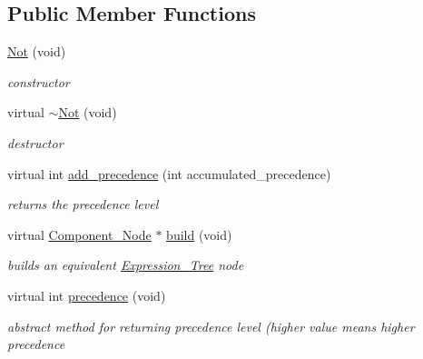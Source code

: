 \subsection*{Public Member Functions}
\begin{DoxyCompactItemize}
\item 
\hyperlink{classMadara_1_1Expression__Tree_1_1Not_afe8e0c695f7eea7d454fb06106767bc5}{Not} (void)
\begin{DoxyCompactList}\small\item\em constructor \item\end{DoxyCompactList}\item 
virtual \hyperlink{classMadara_1_1Expression__Tree_1_1Not_a1652e6eee2648ab3768060773da8d72c}{$\sim$Not} (void)
\begin{DoxyCompactList}\small\item\em destructor \item\end{DoxyCompactList}\item 
virtual int \hyperlink{classMadara_1_1Expression__Tree_1_1Not_ac176735ebcb97996318e20ee02147094}{add\_\-precedence} (int accumulated\_\-precedence)
\begin{DoxyCompactList}\small\item\em returns the precedence level \item\end{DoxyCompactList}\item 
virtual \hyperlink{classMadara_1_1Expression__Tree_1_1Component__Node}{Component\_\-Node} $\ast$ \hyperlink{classMadara_1_1Expression__Tree_1_1Not_a614828716fdb0e51dcf50ec5615325cc}{build} (void)
\begin{DoxyCompactList}\small\item\em builds an equivalent \hyperlink{classMadara_1_1Expression__Tree_1_1Expression__Tree}{Expression\_\-Tree} node \item\end{DoxyCompactList}\item 
virtual int \hyperlink{classMadara_1_1Expression__Tree_1_1Symbol_ac060dedb8d16864591b259df375109b3}{precedence} (void)
\begin{DoxyCompactList}\small\item\em abstract method for returning precedence level (higher value means higher precedence \item\end{DoxyCompactList}\end{DoxyCompactItemize}
